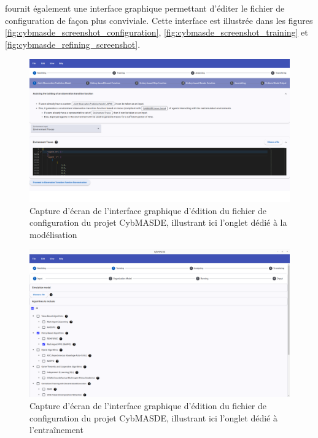 \medskip

 fournit également une interface graphique permettant d'éditer le fichier de configuration de façon plus conviviale. Cette interface est illustrée dans les figures \autoref{fig:cybmasde_screenshot_configuration}, \autoref{fig:cybmasde_screenshot_training} et \autoref{fig:cybmasde_refining_screenshot}.

\begin{figure}[h!]
  \centering
  \includegraphics[width=\linewidth]{figures/CybMASDE_2.png}
  \caption{Capture d'écran de l'interface graphique d'édition du fichier de configuration du projet CybMASDE, illustrant ici l'onglet dédié à la modélisation}
  \label{fig:cybmasde_screenshot_configuration}
\end{figure}

\begin{figure}[h!]
  \centering
  \includegraphics[width=\linewidth]{figures/training_screenshot.png}
  \caption{Capture d'écran de l'interface graphique d'édition du fichier de configuration du projet CybMASDE, illustrant ici l'onglet dédié à l'entraînement}
  \label{fig:cybmasde_screenshot_training}
\end{figure}

